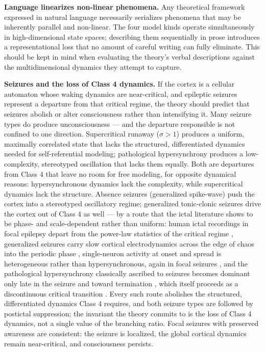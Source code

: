 \documentclass[12pt]{article}
\newcommand{\revstart}{}
\newcommand{\revend}{}
\begin{document}
\textbf{Language linearizes non-linear phenomena.} Any theoretical framework expressed in natural language necessarily serializes phenomena that may be inherently parallel and non-linear. The four model kinds operate simultaneously in high-dimensional state spaces; describing them sequentially in prose introduces a representational loss that no amount of careful writing can fully eliminate. This should be kept in mind when evaluating the theory's verbal descriptions against the multidimensional dynamics they attempt to capture.

{\revstart\textbf{Seizures and the loss of Class 4 dynamics.} If the cortex is a cellular automaton whose waking dynamics are near-critical, and epileptic seizures represent a departure from that critical regime, the theory should predict that seizures abolish or alter consciousness rather than intensifying it. Many seizure types do produce unconsciousness --- and the departure responsible is not confined to one direction. Supercritical runaway ($\sigma > 1$) produces a uniform, maximally correlated state that lacks the structured, differentiated dynamics needed for self-referential modeling; pathological hypersynchrony produces a low-complexity, stereotyped oscillation that lacks them equally. Both are departures from Class 4 that leave no room for free modeling, for opposite dynamical reasons: hypersynchronous dynamics lack the complexity, while supercritical dynamics lack the structure. Absence seizures (generalized spike-wave) push the cortex into a stereotyped oscillatory regime; generalized tonic-clonic seizures drive the cortex out of Class 4 as well --- by a route that the ictal literature shows to be phase- and scale-dependent rather than uniform: human ictal recordings in focal epilepsy depart from the power-law statistics of the critical regime \citep{Meisel2012}, generalized seizures carry slow cortical electrodynamics across the edge of chaos into the periodic phase \citep{Toker2022}, single-neuron activity at onset and spread is heterogeneous rather than hypersynchronous, again in focal seizures \citep{Truccolo2011}, and the pathological hypersynchrony classically ascribed to seizures becomes dominant only late in the seizure and toward termination \citep{Jiruska2013}, which itself proceeds as a discontinuous critical transition \citep{Kramer2012}. Every such route abolishes the structured, differentiated dynamics Class 4 requires, and both seizure types are followed by postictal suppression; the invariant the theory commits to is the loss of Class 4 dynamics, not a single value of the branching ratio. Focal seizures with preserved awareness are consistent: the seizure is localized, the global cortical dynamics remain near-critical, and consciousness persists.\revend}
\end{document}
